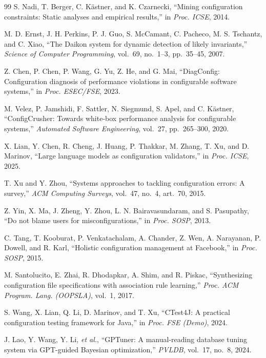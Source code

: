 \documentclass[journal]{IEEEtran}
\begin{document}
\begin{thebibliography}{99}
 S. Nadi, T. Berger, C. K\"astner, and K. Czarnecki, ``Mining configuration constraints: Static analyses and empirical results,'' in \emph{Proc. ICSE}, 2014.

 M. D. Ernst, J. H. Perkins, P. J. Guo, S. McCamant, C. Pacheco, M. S. Tschantz, and C. Xiao, ``The Daikon system for dynamic detection of likely invariants,'' \emph{Science of Computer Programming}, vol.~69, no.~1--3, pp.~35--45, 2007.

 Z. Chen, P. Chen, P. Wang, G. Yu, Z. He, and G. Mai, ``DiagConfig: Configuration diagnosis of performance violations in configurable software systems,'' in \emph{Proc. ESEC/FSE}, 2023.

 M. Velez, P. Jamshidi, F. Sattler, N. Siegmund, S. Apel, and C. K\"astner, ``ConfigCrusher: Towards white-box performance analysis for configurable systems,'' \emph{Automated Software Engineering}, vol.~27, pp.~265--300, 2020.

 X. Lian, Y. Chen, R. Cheng, J. Huang, P. Thakkar, M. Zhang, T. Xu, and D. Marinov, ``Large language models as configuration validators,'' in \emph{Proc. ICSE}, 2025.

 T. Xu and Y. Zhou, ``Systems approaches to tackling configuration errors: A survey,'' \emph{ACM Computing Surveys}, vol.~47, no.~4, art.~70, 2015.

 Z. Yin, X. Ma, J. Zheng, Y. Zhou, L. N. Bairavasundaram, and S. Pasupathy, ``Do not blame users for misconfigurations,'' in \emph{Proc. SOSP}, 2013.

 C. Tang, T. Kooburat, P. Venkatachalam, A. Chander, Z. Wen, A. Narayanan, P. Dowell, and R. Karl, ``Holistic configuration management at Facebook,'' in \emph{Proc. SOSP}, 2015.

 M. Santolucito, E. Zhai, R. Dhodapkar, A. Shim, and R. Piskac, ``Synthesizing configuration file specifications with association rule learning,'' \emph{Proc. ACM Program. Lang. (OOPSLA)}, vol.~1, 2017.

 S. Wang, X. Lian, Q. Li, D. Marinov, and T. Xu, ``CTest4J: A practical configuration testing framework for Java,'' in \emph{Proc. FSE (Demo)}, 2024.

 J. Lao, Y. Wang, Y. Li, \emph{et al.}, ``GPTuner: A manual-reading database tuning system via GPT-guided Bayesian optimization,'' \emph{PVLDB}, vol.~17, no.~8, 2024.


\end{thebibliography}
\end{document}
